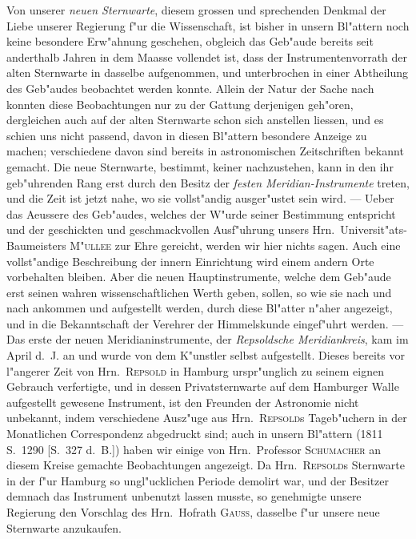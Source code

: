 \documentclass[12pt,a4paper]{article}
\begin{document}
Von unserer \textit{neuen Sternwarte}, diesem grossen und sprechenden Denkmal der Liebe unserer Regierung
f"ur die Wissenschaft, ist bisher in unsern Bl"attern noch keine besondere Erw"ahnung geschehen, obgleich
das Geb"aude bereits seit anderthalb Jahren in dem Maasse vollendet ist, dass der Instrumentenvorrath der
alten Sternwarte in dasselbe aufgenommen, und unterbrochen in einer Abtheilung des Geb"audes beobachtet
werden konnte. Allein der Natur der Sache nach konnten diese Beobachtungen nur zu der Gattung derjenigen
geh"oren, dergleichen auch auf der alten Sternwarte schon sich anstellen liessen, und es schien uns nicht
passend, davon in diesen Bl"attern besondere Anzeige zu machen; verschiedene davon sind bereits in
astronomischen Zeitschriften bekannt gemacht. Die neue Sternwarte, bestimmt, keiner nachzustehen,
kann in den ihr geb"uhrenden Rang erst durch den Besitz der \textit{festen Meridian-Instrumente} treten, und
die Zeit ist jetzt nahe, wo sie vollst"andig ausger"ustet sein wird. --- Ueber das Aeussere des Geb"audes,
welches der W"urde seiner Bestimmung entspricht und der geschickten und geschmackvollen Ausf"uhrung
unsers Hrn.~Universit"ats-Baumeisters \textsc{M"ullee} zur Ehre gereicht, werden wir hier nichts sagen. Auch
eine vollst"andige Beschreibung der innern Einrichtung wird einem andern Orte vorbehalten bleiben.
Aber die neuen Hauptinstrumente, welche dem Geb"aude erst seinen wahren wissenschaftlichen Werth geben,
sollen, so wie sie nach und nach ankommen und aufgestellt werden, durch diese Bl"atter n"aher angezeigt,
und in die Bekanntschaft der Verehrer der Himmelskunde eingef"uhrt werden. --- Das erste der neuen
Meridianinstrumente, der \textit{Repsoldsche Meridiankreis}, kam im April d.~J. an und wurde von dem K"unstler
selbst aufgestellt. Dieses bereits vor l"angerer Zeit von Hrn.~\textsc{Repsold} in Hamburg urspr"unglich zu seinem
eignen Gebrauch verfertigte, und in dessen Privatsternwarte auf dem Hamburger Walle aufgestellt gewesene
Instrument, ist den Freunden der Astronomie nicht unbekannt, indem verschiedene Ausz"uge aus Hrn.~\textsc{Repsold}s
Tageb"uchern in der Monatlichen Correspondenz abgedruckt sind; auch in unsern Bl"attern (1811
S.~1290 [S.~327 d.~B.]) haben wir einige von Hrn.~Professor \textsc{Schumacher} an diesem Kreise gemachte
Beobachtungen angezeigt. Da Hrn.~\textsc{Repsold}s Sternwarte in der f"ur Hamburg so ungl"ucklichen Periode
demolirt war, und der Besitzer demnach das Instrument unbenutzt lassen musste, so genehmigte unsere
Regierung den Vorschlag des Hrn.~Hofrath \textsc{Gauss}, dasselbe f"ur unsere neue Sternwarte anzukaufen.
\end{document}
